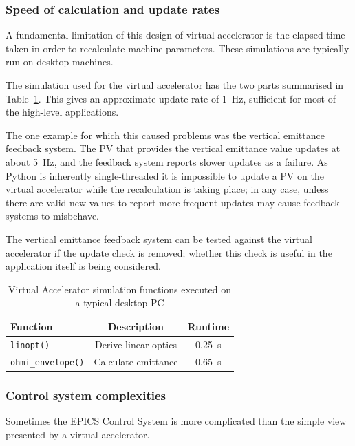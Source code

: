\documentclass[a4paper,
               keeplastbox,   %
               ]{jacow}
\begin{document}
\subsubsection{Speed of calculation and update rates}

A fundamental limitation of this design of virtual accelerator is the elapsed time
taken in order to recalculate machine parameters. These simulations are typically
run on desktop machines.

The simulation used for the virtual accelerator has the two parts summarised in 
Table~\ref{simfunctions}. This gives an approximate update rate of \SI{1}{Hz}, sufficient
for most of the high-level applications.

The one example for which this caused problems was the vertical emittance feedback
system. The PV that provides the vertical emittance value updates at about \SI{5}{Hz},
and the feedback system reports slower updates as a failure. As Python is inherently
single-threaded it is impossible to update a PV on the virtual accelerator while 
the recalculation is taking place; in any case, unless there are valid new values to
report more frequent updates may cause feedback systems to misbehave.

The vertical emittance feedback system can be tested against the virtual accelerator
if the update check is removed; whether this check is useful in the application itself is
being considered.

\begin{table}[!hbt]
   \centering
   \caption{Virtual Accelerator simulation functions executed on a typical desktop PC}
   \begin{tabular}{lcc}
       \toprule
       \textbf{Function} & \textbf{Description}                      & \textbf{Runtime} \\
       \midrule
           \texttt{linopt()}         & Derive linear optics            & \SI{0.25}{s}        \\
           \texttt{ohmi\_envelope()}  & Calculate emittance      & \SI{0.65}{s}        \\
       \bottomrule
   \end{tabular}
   \label{simfunctions}
\end{table}

\subsubsection{Control system complexities}

Sometimes the EPICS Control System is more complicated than the simple view presented
by a virtual accelerator.
\end{document}
